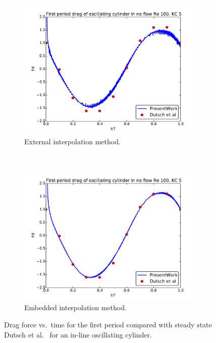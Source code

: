 \begin{figure}[!htb]
	\centering
	\begin{subfigure}{0.4\textwidth}
		\includegraphics[width=\linewidth]{staticexinit}
		\caption{External interpolation method.}
	\end{subfigure}
	~
	\begin{subfigure}{0.4\textwidth}
		\includegraphics[width=\linewidth]{staticeminit}
		\caption{Embedded interpolation method.}
	\end{subfigure}
	\caption{Drag force vs.~time for the first period compared with steady state Dutsch et al.~\cite{dutsch1998low} for an in-line oscillating cylinder.}
	\label{fig:staticInit}
\end{figure}

